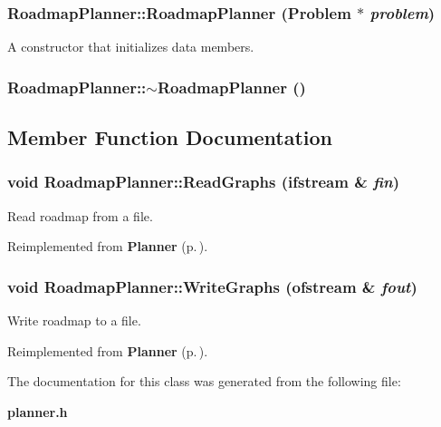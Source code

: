 \subsubsection{\setlength{\rightskip}{0pt plus 5cm}Roadmap\-Planner::Roadmap\-Planner ({\bf Problem} $\ast$ {\em problem})}\label{class_RoadmapPlanner_a0}


A constructor that initializes data members.

\subsubsection{\setlength{\rightskip}{0pt plus 5cm}Roadmap\-Planner::$\sim$Roadmap\-Planner ()\hspace{0.3cm}{\tt  [inline]}}\label{class_RoadmapPlanner_a1}




\subsection{Member Function Documentation}
\subsubsection{\setlength{\rightskip}{0pt plus 5cm}void Roadmap\-Planner::Read\-Graphs (ifstream \& {\em fin})\hspace{0.3cm}{\tt  [virtual]}}\label{class_RoadmapPlanner_a3}


Read roadmap from a file.



Reimplemented from {\bf Planner} {\rm (p.\,\pageref{class_Planner_a6})}.
\subsubsection{\setlength{\rightskip}{0pt plus 5cm}void Roadmap\-Planner::Write\-Graphs (ofstream \& {\em fout})\hspace{0.3cm}{\tt  [virtual]}}\label{class_RoadmapPlanner_a2}


Write roadmap to a file.



Reimplemented from {\bf Planner} {\rm (p.\,\pageref{class_Planner_a5})}.

The documentation for this class was generated from the following file:\begin{CompactItemize}
\item 
{\bf planner.h}\end{CompactItemize}
